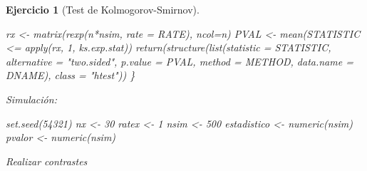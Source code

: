 \documentclass[
]{book}
\newenvironment{Shaded}{\begin{snugshade}}{\end{snugshade}}
\newcommand{\AttributeTok}[1]{\textcolor[rgb]{0.77,0.63,0.00}{#1}}
\newcommand{\CommentTok}[1]{\textcolor[rgb]{0.56,0.35,0.01}{\textit{#1}}}
\newcommand{\ControlFlowTok}[1]{\textcolor[rgb]{0.13,0.29,0.53}{\textbf{#1}}}
\newcommand{\DecValTok}[1]{\textcolor[rgb]{0.00,0.00,0.81}{#1}}
\newcommand{\FunctionTok}[1]{\textcolor[rgb]{0.00,0.00,0.00}{#1}}
\newcommand{\NormalTok}[1]{#1}
\newcommand{\OtherTok}[1]{\textcolor[rgb]{0.56,0.35,0.01}{#1}}
\newcommand{\SpecialCharTok}[1]{\textcolor[rgb]{0.00,0.00,0.00}{#1}}
\newcommand{\StringTok}[1]{\textcolor[rgb]{0.31,0.60,0.02}{#1}}
\theoremstyle{break}
\newtheorem{exercise}{Ejercicio}[chapter]
\theoremstyle{nonumberplain}
\renewcommand{\CommentTok}[1]{\textcolor[rgb]{0.41,0.41,0.41}{\texttt{#1}}}
\begin{document}
\begin{exercise}[Test de Kolmogorov-Smirnov]
\begin{enumerate}
\begin{Shaded}
\begin{Highlighting}[]
\NormalTok{  rx }\OtherTok{\textless{}{-}} \FunctionTok{matrix}\NormalTok{(}\FunctionTok{rexp}\NormalTok{(n}\SpecialCharTok{*}\NormalTok{nsim, }\AttributeTok{rate =}\NormalTok{ RATE), }\AttributeTok{ncol=}\NormalTok{n)}
\NormalTok{  PVAL }\OtherTok{\textless{}{-}} \FunctionTok{mean}\NormalTok{(STATISTIC }\SpecialCharTok{\textless{}=} \FunctionTok{apply}\NormalTok{(rx, }\DecValTok{1}\NormalTok{, ks.exp.stat))}
  \FunctionTok{return}\NormalTok{(}\FunctionTok{structure}\NormalTok{(}\FunctionTok{list}\NormalTok{(}\AttributeTok{statistic =}\NormalTok{ STATISTIC, }\AttributeTok{alternative =} \StringTok{"two.sided"}\NormalTok{, }
                   \AttributeTok{p.value =}\NormalTok{ PVAL, }\AttributeTok{method =}\NormalTok{ METHOD, }\AttributeTok{data.name =}\NormalTok{ DNAME), }
                   \AttributeTok{class =} \StringTok{"htest"}\NormalTok{))}
\NormalTok{\}}
\end{Highlighting}
\end{Shaded}

  Simulación:

\begin{Shaded}
\begin{Highlighting}[]
\FunctionTok{set.seed}\NormalTok{(}\DecValTok{54321}\NormalTok{)}
\NormalTok{nx }\OtherTok{\textless{}{-}} \DecValTok{30}
\NormalTok{ratex }\OtherTok{\textless{}{-}} \DecValTok{1}
\NormalTok{nsim }\OtherTok{\textless{}{-}} \DecValTok{500}
\NormalTok{estadistico }\OtherTok{\textless{}{-}} \FunctionTok{numeric}\NormalTok{(nsim)}
\NormalTok{pvalor }\OtherTok{\textless{}{-}} \FunctionTok{numeric}\NormalTok{(nsim)}
\end{Highlighting}
\end{Shaded}

  Realizar contrastes

\begin{Shaded}
\end{Shaded}


\end{enumerate}
\end{exercise}
\end{document}
